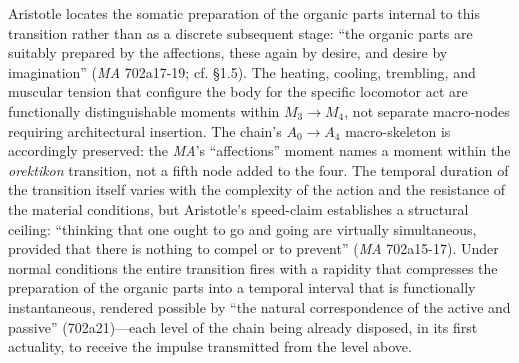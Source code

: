 Aristotle locates the somatic preparation of the organic parts internal to this transition rather than as a discrete subsequent stage: ``the organic parts are suitably prepared by the affections, these again by desire, and desire by imagination'' (\textit{MA} 702a17-19; cf. \S 1.5). The heating, cooling, trembling, and muscular tension that configure the body for the specific locomotor act are functionally distinguishable moments within $M_3 \rightarrow M_4$, not separate macro-nodes requiring architectural insertion. The chain's $A_0 \rightarrow A_4$ macro-skeleton is accordingly preserved: the \textit{MA}'s ``affections'' moment names a moment within the \textit{orektikon} transition, not a fifth node added to the four. The temporal duration of the transition itself varies with the complexity of the action and the resistance of the material conditions, but Aristotle's speed-claim establishes a structural ceiling: ``thinking that one ought to go and going are virtually simultaneous, provided that there is nothing to compel or to prevent'' (\textit{MA} 702a15-17). Under normal conditions the entire transition fires with a rapidity that compresses the preparation of the organic parts into a temporal interval that is functionally instantaneous, rendered possible by ``the natural correspondence of the active and passive'' (702a21)---each level of the chain being already disposed, in its first actuality, to receive the impulse transmitted from the level above.

